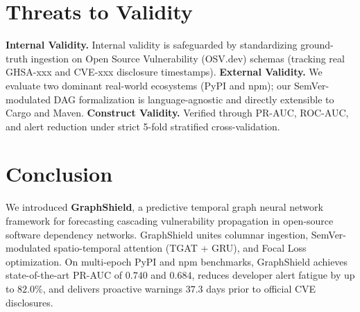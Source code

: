 \documentclass[sigconf,screen]{acmart}
\begin{document}
\section{Threats to Validity}
\label{sec:threats}

\noindent\textbf{Internal Validity.} Internal validity is safeguarded by standardizing ground-truth ingestion on Open Source Vulnerability (OSV.dev) schemas (tracking real GHSA-xxx and CVE-xxx disclosure timestamps). \textbf{External Validity.} We evaluate two dominant real-world ecosystems (PyPI and npm); our SemVer-modulated DAG formalization is language-agnostic and directly extensible to Cargo and Maven. \textbf{Construct Validity.} Verified through PR-AUC, ROC-AUC, and alert reduction under strict 5-fold stratified cross-validation.

\section{Conclusion}
\label{sec:conclusion}

We introduced \textbf{GraphShield}, a predictive temporal graph neural network framework for forecasting cascading vulnerability propagation in open-source software dependency networks. GraphShield unites columnar ingestion, SemVer-modulated spatio-temporal attention (TGAT + GRU), and Focal Loss optimization. On multi-epoch PyPI and npm benchmarks, GraphShield achieves state-of-the-art PR-AUC of $0.740$ and $0.684$, reduces developer alert fatigue by up to $82.0\%$, and delivers proactive warnings $37.3$ days prior to official CVE disclosures.

\clearpage
\end{document}
